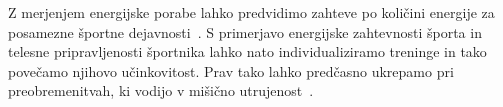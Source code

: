 Z merjenjem energijske porabe lahko predvidimo zahteve po količini energije za posamezne športne dejavnosti~\cite{botton2011energy,osgnach2010energy}. S primerjavo energijske zahtevnosti športa in telesne pripravljenosti športnika lahko nato individualiziramo treninge in tako povečamo njihovo učinkovitost. Prav tako lahko predčasno ukrepamo pri preobremenitvah, ki vodijo v mišično utrujenost~\cite{sahlin1998energy,reilly1997energetics}.

\renewcommand{\folder}{./pogl/01-uvod}




